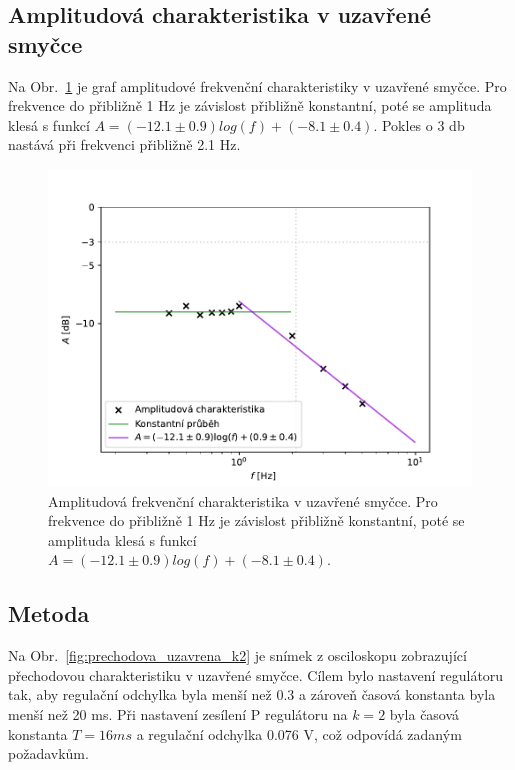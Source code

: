 	\subsection{Amplitudová charakteristika v uzavřené smyčce}
		Na Obr.~\ref{fig:amplitudova_uzavrena} je graf amplitudové frekvenční charakteristiky v uzavřené smyčce. Pro frekvence do přibližně 1 Hz je závislost přibližně konstantní, poté se amplituda klesá s funkcí $A=(-12.1\pm 0.9)log(f)+(-8.1\pm 0.4)$. Pokles o 3 db nastává při frekvenci přibližně 2.1 Hz. 
		\begin{figure}[H] 
			\centering
			\includegraphics[scale = 0.7]{img/graf_amplitudova_uzavrena.pdf} 
			\caption{Amplitudová frekvenční charakteristika v uzavřené smyčce. Pro frekvence do přibližně 1 Hz je závislost přibližně konstantní, poté se amplituda klesá s funkcí $A=(-12.1\pm 0.9)log(f)+(-8.1\pm 0.4)$.} 
			\label{fig:amplitudova_uzavrena}
		\end{figure}

	\subsection{Metoda }
		Na Obr.~\ref{fig:prechodova_uzavrena_k2} je snímek z osciloskopu zobrazující přechodovou charakteristiku v uzavřené smyčce. Cílem bylo nastavení regulátoru tak, aby  regulační odchylka byla menší než 0.3 a zároveň časová konstanta byla menší než 20 ms. Při nastavení zesílení P regulátoru na $k=2$ byla časová konstanta $T=16\unit{ms}$ a regulační odchylka 0.076 V, což odpovídá zadaným požadavkům.
		
